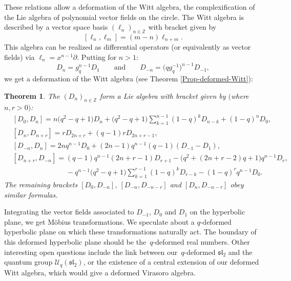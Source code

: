 \documentclass[10pt,a4paper]{amsart}
\numberwithin{equation}{section}
\newtheorem{Theorem}{Theorem}[section]
\newcommand*{\Z}{\mathbb{Z}}
\begin{document}
These relations allow a deformation of the Witt algebra, the complexification of the Lie algebra of polynomial vector fields on the circle. The Witt algebra is described by a vector space basis $(\ell_n)_{n\in\Z}$ with bracket given by
\[
[\ell_n,\ell_m]=(m-n)\ell_{n+m}.
\]
This algebra can be realized as differential operators (or equivalently as vector fields) via ${\ell_n=x^{n-1}\partial}$.
Putting for $n>1$:
\[
D_n = g_q^{n-1}D_1 \qquad \text{and}\qquad D_{-n} = \big(qg_q^{-1}\big)^{n-1}D_{-1},
\]
we get a deformation of the Witt algebra (see Theorem \ref{Prop-deformed-Witt}):
\begin{Theorem}
The $(D_n)_{n\in\mathbb{Z}}$ form a Lie algebra with bracket given by $($where $n,r >0)$:
\begin{align*}
&[D_0,D_n]= n\big(q^2-q+1\big)D_n+\big(q^2-q+1\big)\displaystyle\sum_{k=1}^{n-1}(1-q)^kD_{n-k} + (1-q)^nD_0, \\
&[D_n,D_{n+r}]=rD_{2n+r}+(q-1)rD_{2n+r-1},\\
&[D_{-n},D_n]= 2nq^{n-1}D_0+(2n-1)q^{n-1}(q-1)(D_{-1}-D_1),\\
&[D_{n+r},D_{-n}]= (q-1)q^{n-1}(2n+r-1)D_{r+1}-\big(q^2+(2n+r-2)q+1\big)q^{n-1}D_r,\\
&\phantom{[D_{n+r},D_{-n}]=}{} -q^{n-1}\big(q^2-q+1\big)\displaystyle\sum_{k=1}^{r-1}(1-q)^kD_{r-k}-(1-q)^rq^{n-1}D_0.
\end{align*}
The remaining brackets $[D_0,D_{-n}]$, $[D_{-n},D_{-n-r}]$ and $[D_n,D_{-n-r}]$ obey similar formulas.
\end{Theorem}

Integrating the vector fields associated to $D_{-1}$, $D_0$ and $D_1$ on the hyperbolic plane, we get M\"obius transformations. We speculate about a $q$-deformed hyperbolic plane on which these transformations naturally act. The boundary of this deformed hyperbolic plane should be the~$q$-deformed real numbers. Other interesting open questions include the link between our~$q$-deformed $\mathfrak{sl}_2$ and the quantum group $\mathcal{U}_q(\mathfrak{sl}_2)$, or the existence of a central extension of our deformed Witt algebra, which would give a deformed Virasoro algebra.
\end{document}

